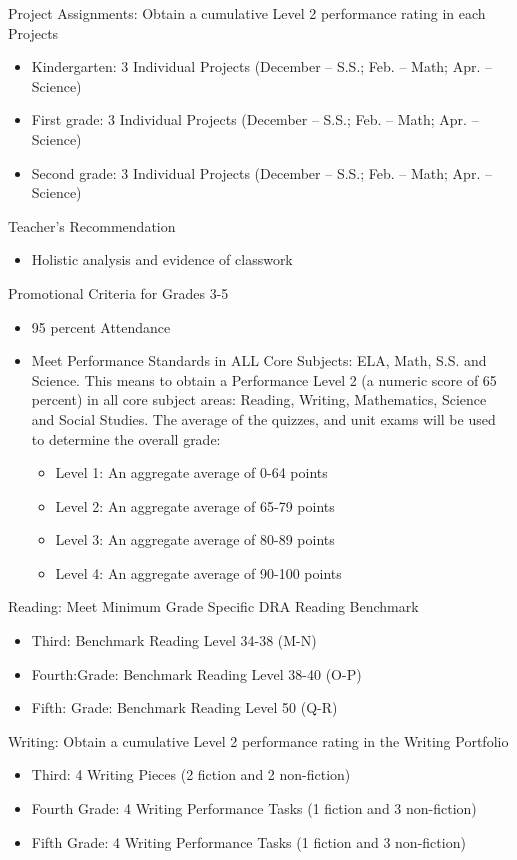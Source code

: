 \documentclass[12pt,letterpaper]{article}
\begin{document}
Project Assignments: Obtain a cumulative Level 2 performance rating in each Projects
\pagebreak
\vspace*{1.5cm}
\begin{itemize}
\item Kindergarten: 3 Individual Projects (December – S.S.; Feb. – Math; Apr. – Science)
\item First grade: 3 Individual Projects (December – S.S.; Feb. – Math; Apr. – Science)
\item Second grade: 3 Individual Projects (December – S.S.; Feb. – Math; Apr. – Science)
\end{itemize}
Teacher’s Recommendation
\begin{itemize}
\item Holistic analysis and evidence of classwork
\end{itemize}
Promotional Criteria for Grades 3-5
\begin{itemize}
\item 95 percent Attendance
\item Meet Performance Standards in ALL Core Subjects: ELA, Math, S.S. and Science. This means to obtain a Performance Level 2 (a numeric score of 65 percent) in all core subject areas: Reading, Writing, 
Mathematics, Science and Social Studies. The average of the quizzes, and unit exams will be used to determine the overall grade:
	\begin{itemize}
	\item Level 1: An aggregate average of 0-64 points
	\item Level 2: An aggregate average of 65-79 points
	\item Level 3: An aggregate average of 80-89 points
	\item Level 4: An aggregate average of 90-100 points
	\end{itemize}
\end{itemize}

Reading: Meet Minimum Grade Specific DRA Reading Benchmark
\begin{itemize}
\item Third: Benchmark Reading Level 34-38 (M-N)
\item Fourth:Grade: Benchmark Reading Level 38-40 (O-P)
\item Fifth: Grade: Benchmark Reading Level 50 (Q-R)
\end{itemize}

Writing: Obtain a cumulative Level 2 performance rating in the Writing Portfolio
\begin{itemize}
\item Third: 4 Writing Pieces (2 fiction and 2 non-fiction)
\pagebreak
\vspace*{1.5cm}
\item Fourth Grade: 4 Writing Performance Tasks (1 fiction and 3 non-fiction)
\item Fifth Grade: 4 Writing Performance Tasks (1 fiction and 3 non-fiction)
\end{itemize}
\end{document}
